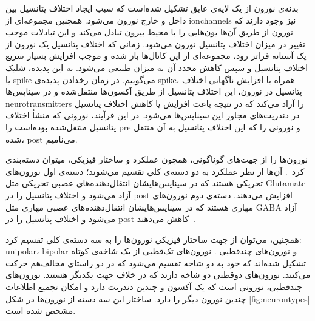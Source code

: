 \documentclass[12pt]{report}
\begin{document}
	
	بدنه‌ی نورون از یک لایه‌ی عایق تشکیل شده‌است که سبب ایجاد اختلاف پتانسیل بین داخل و خارج نورون می‌شود. همچنین مجموعه‌ای از \gls{ionchannels} نیز وجود دارند که نورون از طریق آن‌ها یون‌هایی را با محیط بیرون تبادل می‌کند و این تبادلات موجب تغییر در میزان اختلاف پتانسیل نورون می‌شود. زمانی که اختلاف پتانسیل یک نورون از یک آستانه فراتر رود، مجموعه‌ای از این کانال‌ها باز شده و موجب افزایش بسیار سریع اختلاف پتانسیل و سپس کاهش مجدد آن به میزان طبیعی می‌شود. به این پدیده، شلیک یا \gls{spike} می‌گوییم. در زمان رخدادن پدیده‌ی \gls{spike}، همراه با افزایش ناگهانی اختلاف پتانسیل در نورون، این اختلاف پتانسیل از طریق آکسون‌ها منتقل‌شده و در سیناپس‌ها \gls{neurotransmitters} را آزاد می‌کند  که در نتیجه باعث افزایش یا کاهش اختلاف پتانسیل در دندریت‌های مجاور این سیناپس‌ها می‌شود. در این فرآیند، نورونی که منشأ اختلاف پتانسیل منتقل‌شده بوده‌است را \gls{pre}‌ و نورونی را که این اختلاف پتانسیل به آن منتقل شده، \gls{post}‌ می‌نامیم.
	
	نورون‌ها را از جهت‌های گوناگونی، همچون عملکرد و ساختار فیزیکی، میتوان دسته‌بندی کرد~\cite{NARAYANAN2016183}. آن‌ها از نظر عملکرد به دو دسته‌ی کلی تقسیم می‌شوند؛ دسته‌ی اول نورون‌های تحریکی هستند که در سیناپس‌هایشان انتقال‌دهنده‌های عصبی تحریکی مثل \gls{Glutamate} آزاد می‌شود و اختلاف پتانسیل را در \gls{post} افزایش می‌دهند. دسته‌ی دوم نورون‌های مهاری هستند که در سیناپس‌هایشان انتقال‌دهنده‌های عصبی مهاری مثل \gls{GABA} آزاد می‌شود و اختلاف پتانسیل را در \gls{post} کاهش می‌دهند~\cite{Purves2001-ns}.
	
	همچنین، می‌توان از جهت ساختار فیزیکی نورون‌ها را به سه دسته‌ی کلی تقسیم کرد:
\gls{unipolar}،
\gls{bipolar}
و نورون‌های چند‌قطبی \cite{brainitel01736978}. 
	نورون‌های تک‌قطبی از یک شاخه‌ی کوتاه تشکیل شده‌اند که خود به دو شاخه تقسیم می‌شود که در دو راستای مخالف‌هم حرکت می‌کنند. نورون‌های دو‌قطبی دو شاخه دارند که در خلاف جهت یکدیگر هستند. نورون‌های چندقطبی، نورونی است که یک آکسون و چندین دندریت دارد و امکان تجمیع اطلاعات چندین نورون دیگر را دارد. ساختار این سه دسته از نورون‌ها در شکل \ref{fig:neurontypes} مشخص شده است.
	
\end{document}
